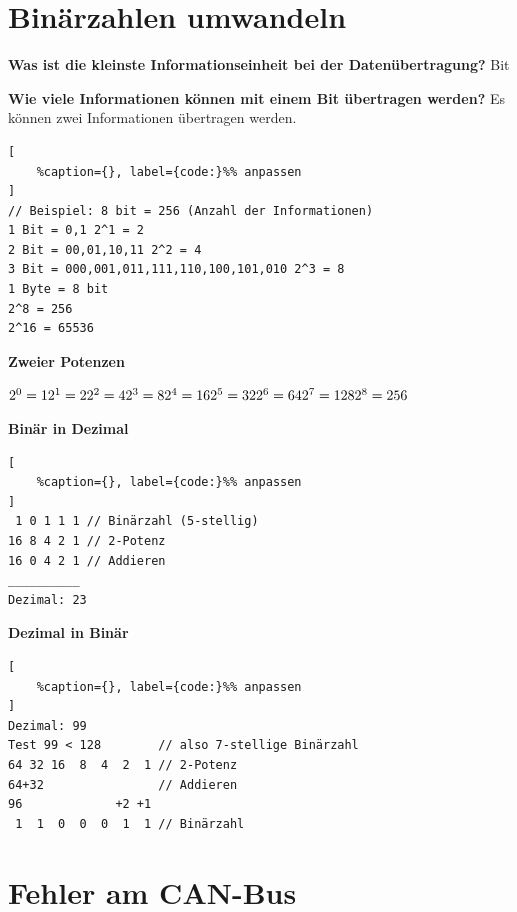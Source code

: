 \newpage

\section{Binärzahlen umwandeln}\label{binaerzahlen-umwandeln}

\textbf{Was ist die kleinste Informationseinheit bei der
Datenübertragung?} Bit

\textbf{Wie viele Informationen können mit einem Bit übertragen werden?}
Es können zwei Informationen übertragen werden.

\lstset{language=Python}%
\begin{lstlisting}[
	%caption={}, label={code:}%% anpassen
]
// Beispiel: 8 bit = 256 (Anzahl der Informationen)
1 Bit = 0,1 2^1 = 2
2 Bit = 00,01,10,11 2^2 = 4
3 Bit = 000,001,011,111,110,100,101,010 2^3 = 8
1 Byte = 8 bit
2^8 = 256
2^16 = 65536 
\end{lstlisting}

\textbf{Zweier Potenzen}

$2^0 = 1 \\ 2^1 = 2 \\2^2 = 4 \\2^3 = 8 \\2^4 = 16 \\2^5 = 32 \\2^6 = 64 \\2^7 = 128 \\2^8 = 256$

\textbf{Binär in Dezimal}

\lstset{language=Python}%
\begin{lstlisting}[
	%caption={}, label={code:}%% anpassen
]
 1 0 1 1 1 // Binärzahl (5-stellig)
16 8 4 2 1 // 2-Potenz
16 0 4 2 1 // Addieren
__________
Dezimal: 23
\end{lstlisting}

\textbf{Dezimal in Binär}

\lstset{language=Python}%
\begin{lstlisting}[
	%caption={}, label={code:}%% anpassen
]
Dezimal: 99
Test 99 < 128        // also 7-stellige Binärzahl
64 32 16  8  4  2  1 // 2-Potenz
64+32                // Addieren
96             +2 +1 
 1  1  0  0  0  1  1 // Binärzahl 
\end{lstlisting}

\newpage

\section{Fehler am CAN-Bus}\label{fehler-am-can-bus}

